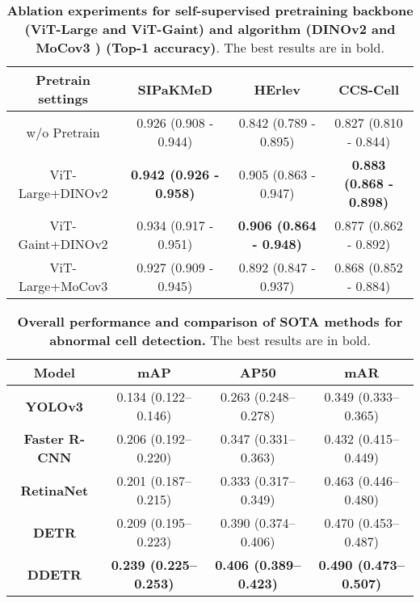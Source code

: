 \clearpage
\begin{table}[h] 
\renewcommand{\arraystretch}{1.5}
\renewcommand{\tablename}{Extended Data Table.}
\centering 
\caption{\textbf{Ablation experiments for self-supervised pretraining backbone (ViT-Large and ViT-Gaint) and algorithm (DINOv2 \cite{oquabdinov2} and MoCov3 \cite{chen2021empirical}) (Top-1 accuracy)}. The best results are in bold.}
\begin{tabular}{c|ccc} 
\hline
 \rowcolor{cusyellow} \textbf{Pretrain settings} & \textbf{SIPaKMeD }&\textbf{HErlev} & \textbf{CCS-Cell} \\ 
\hline
w/o Pretrain&0.926 (0.908 - 0.944) & 0.842 (0.789 - 0.895)&0.827 (0.810 - 0.844)\\
 \rowcolor{cusyellowl} ViT-Large+DINOv2 &\textbf{0.942 (0.926 - 0.958)} & 0.905 (0.863 - 0.947)&\textbf{0.883 (0.868 - 0.898)}\\
ViT-Gaint+DINOv2 &0.934 (0.917 - 0.951) & \textbf{0.906 (0.864 - 0.948)}&0.877 (0.862 - 0.892)\\
 \rowcolor{cusyellowl}ViT-Large+MoCov3 &0.927 (0.909 - 0.945) & 0.892 (0.847 - 0.937)&0.868 (0.852 - 0.884)\\
\hline 
\end{tabular} 
\label{ST_pretrain_ablation}
\end{table}




\clearpage
\begin{table}[h] 
\renewcommand{\arraystretch}{1.5}
\renewcommand{\tablename}{Extended Data Table.}
\centering 
\caption{\textbf{Overall performance and comparison of SOTA  methods for abnormal cell detection.} The best results are in bold.}
    \begin{tabular}{c|ccc}
    \hline
    \rowcolor{cusyellow} \textbf{Model} & \textbf{mAP} & \textbf{AP50} & \textbf{mAR} \\ 
    \hline
    \textbf{YOLOv3} & 0.134 (0.122–0.146) & 0.263 (0.248–0.278) & 0.349 (0.333–0.365) \\ 
     \rowcolor{cusyellowl} \textbf{Faster R-CNN} & 0.206 (0.192–0.220) & 0.347 (0.331–0.363) & 0.432 (0.415–0.449) \\ 
    \textbf{RetinaNet} & 0.201 (0.187–0.215) & 0.333 (0.317–0.349) & 0.463 (0.446–0.480) \\ 
     \rowcolor{cusyellowl} \textbf{DETR} & 0.209 (0.195–0.223) & 0.390 (0.374–0.406) & 0.470 (0.453–0.487) \\ 
    \textbf{DDETR} & \textbf{0.239 (0.225–0.253)} & \textbf{0.406 (0.389–0.423)} & \textbf{0.490 (0.473–0.507)} \\ 
    \hline
\end{tabular}
\label{ST_det}
\end{table}

